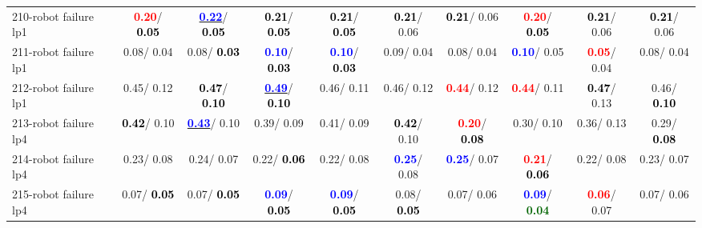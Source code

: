 \begin{table}[h]
\begin{center}
{\begin{tabular}{lc|c|c|c|c|c|c|c|c}
210-robot failure lp1 & \textcolor{red}{\textbf{  0.20}}/\textcolor{black}{\textbf{  0.05}} & \underline{\textcolor{blue}{\textbf{  0.22}}}/\textcolor{black}{\textbf{  0.05}} & \textcolor{black}{\textbf{  0.21}}/\textcolor{black}{\textbf{  0.05}} & \textcolor{black}{\textbf{  0.21}}/\textcolor{black}{\textbf{  0.05}} & \textcolor{black}{\textbf{  0.21}}/  0.06 & \textcolor{black}{\textbf{  0.21}}/  0.06 & \textcolor{red}{\textbf{  0.20}}/\textcolor{black}{\textbf{  0.05}} & \textcolor{black}{\textbf{  0.21}}/  0.06 & \textcolor{black}{\textbf{  0.21}}/  0.06 \\
211-robot failure lp1 &   0.08/  0.04 &   0.08/\textcolor{black}{\textbf{  0.03}} & \textcolor{blue}{\textbf{  0.10}}/\textcolor{black}{\textbf{  0.03}} & \textcolor{blue}{\textbf{  0.10}}/\textcolor{black}{\textbf{  0.03}} &   0.09/  0.04 &   0.08/  0.04 & \textcolor{blue}{\textbf{  0.10}}/  0.05 & \textcolor{red}{\textbf{  0.05}}/  0.04 &   0.08/  0.04 \\
212-robot failure lp1 &   0.45/  0.12 & \textcolor{black}{\textbf{  0.47}}/\textcolor{black}{\textbf{  0.10}} & \underline{\textcolor{blue}{\textbf{  0.49}}}/\textcolor{black}{\textbf{  0.10}} &   0.46/  0.11 &   0.46/  0.12 & \textcolor{red}{\textbf{  0.44}}/  0.12 & \textcolor{red}{\textbf{  0.44}}/  0.11 & \textcolor{black}{\textbf{  0.47}}/  0.13 &   0.46/\textcolor{black}{\textbf{  0.10}} \\
213-robot failure lp4 & \textcolor{black}{\textbf{  0.42}}/  0.10 & \underline{\textcolor{blue}{\textbf{  0.43}}}/  0.10 &   0.39/  0.09 &   0.41/  0.09 & \textcolor{black}{\textbf{  0.42}}/  0.10 & \textcolor{red}{\textbf{  0.20}}/\textcolor{black}{\textbf{  0.08}} &   0.30/  0.10 &   0.36/  0.13 &   0.29/\textcolor{black}{\textbf{  0.08}} \\ \hline
214-robot failure lp4 &   0.23/  0.08 &   0.24/  0.07 &   0.22/\textcolor{black}{\textbf{  0.06}} &   0.22/  0.08 & \textcolor{blue}{\textbf{  0.25}}/  0.08 & \textcolor{blue}{\textbf{  0.25}}/  0.07 & \textcolor{red}{\textbf{  0.21}}/\textcolor{black}{\textbf{  0.06}} &   0.22/  0.08 &   0.23/  0.07 \\
215-robot failure lp4 &   0.07/\textcolor{black}{\textbf{  0.05}} &   0.07/\textcolor{black}{\textbf{  0.05}} & \textcolor{blue}{\textbf{  0.09}}/\textcolor{black}{\textbf{  0.05}} & \textcolor{blue}{\textbf{  0.09}}/\textcolor{black}{\textbf{  0.05}} &   0.08/\textcolor{black}{\textbf{  0.05}} &   0.07/  0.06 & \textcolor{blue}{\textbf{  0.09}}/\textcolor{darkgreen}{\textbf{  0.04}} & \textcolor{red}{\textbf{  0.06}}/  0.07 &   0.07/  0.06 \\

\end{tabular}}
\end{center}
\end{table}
